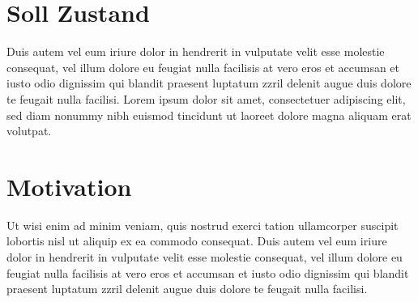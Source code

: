 \documentclass[
a4paper, 			%
12pt,					%
headsepline,	%
ngerman,			%
]{scrartcl} %
\begin{document}
	
	
	
	\setcounter{page}{0}
	
	
	
	
	\singlespacing
	
	\newpage
	\tableofcontents
	
	
	\newpage
	
	\setcounter{page}{1}
	
	\newpage
	\fancyhead[L]{\nouppercase{\leftmark}} %
	
	\onehalfspacing
	
	
	\newpage \addtocounter{page}{-1}
	\thispagestyle{empty} 
	\mbox{}
	
	\newpage
	
	
	\newpage
	\section{Soll Zustand}
	Duis autem vel eum iriure dolor in hendrerit in vulputate velit esse molestie consequat, vel illum dolore eu feugiat nulla facilisis at vero eros et accumsan et iusto odio dignissim qui blandit praesent luptatum zzril delenit augue duis dolore te feugait nulla facilisi. Lorem ipsum dolor sit amet, consectetuer adipiscing elit, sed diam nonummy nibh euismod tincidunt ut laoreet dolore magna aliquam erat volutpat.
	
	\newpage
	\section{Motivation}
	Ut wisi enim ad minim veniam, quis nostrud exerci tation ullamcorper suscipit lobortis nisl ut aliquip ex ea commodo consequat. Duis autem vel eum iriure dolor in hendrerit in vulputate velit esse molestie consequat, vel illum dolore eu feugiat nulla facilisis at vero eros et accumsan et iusto odio dignissim qui blandit praesent luptatum zzril delenit augue duis dolore te feugait nulla facilisi.
	
\end{document}
